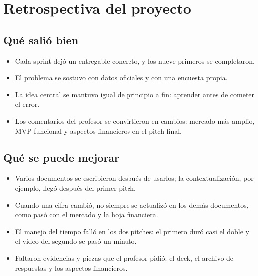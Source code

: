 \documentclass[11pt,a4paper]{article}
\begin{document}
\section{Retrospectiva del proyecto}

\subsection{Qué salió bien}
\begin{itemize}[leftmargin=1.5em]
  \item {Cada sprint dejó un entregable concreto, y los nueve primeros se completaron.}
  \item {El problema se sostuvo con datos oficiales y con una encuesta propia.}
  \item {La idea central se mantuvo igual de principio a fin: aprender antes de cometer el error.}
  \item {Los comentarios del profesor se convirtieron en cambios: mercado más amplio, MVP funcional y aspectos financieros en el pitch final.}
\end{itemize}

\subsection{Qué se puede mejorar}
\begin{itemize}[leftmargin=1.5em]
  \item {Varios documentos se escribieron después de usarlos; la contextualización, por ejemplo, llegó después del primer pitch.}
  \item {Cuando una cifra cambió, no siempre se actualizó en los demás documentos, como pasó con el mercado y la hoja financiera.}
  \item {El manejo del tiempo falló en los dos pitches: el primero duró casi el doble y el video del segundo se pasó un minuto.}
  \item {Faltaron evidencias y piezas que el profesor pidió: el deck, el archivo de respuestas y los aspectos financieros.}
\end{itemize}
\end{document}
